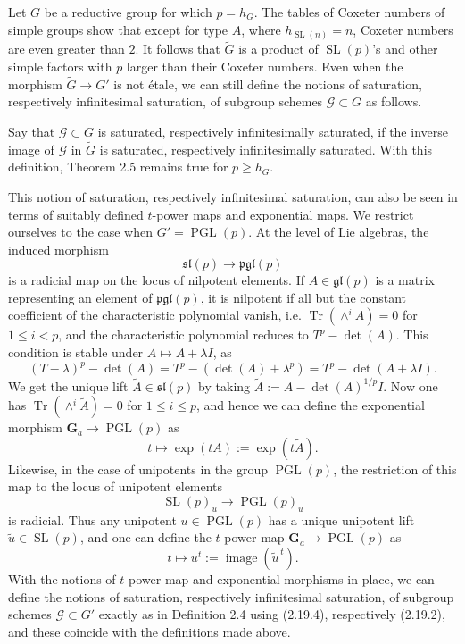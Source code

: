 \documentclass[11pt]{article}
\newcommand{\Ga}{\mathbf G_a}
\newcommand{\SL}{\operatorname{SL}}
\newcommand{\PGL}{\operatorname{PGL}}
\newcommand{\Tr}{\operatorname{Tr}}
\begin{document}
Let \(G\) be a reductive group for which \(p=h_G\). The tables of Coxeter numbers of
simple groups show that except for type \(A\), where \(h_{\SL(n)}=n\), Coxeter numbers
are even greater than \(2\). It follows that \(\widetilde G\) is a product of
\(\SL(p)\)'s and other simple factors with \(p\) larger than their Coxeter numbers. Even
when the morphism \(\widetilde G\to G'\) is not étale, we can still define the notions
of saturation, respectively infinitesimal saturation, of subgroup schemes
\(\mathcal G\subset G\) as follows.

Say that \(\mathcal G\subset G\) is saturated, respectively infinitesimally saturated, if
the inverse image of \(\mathcal G\) in \(\widetilde G\) is saturated, respectively
infinitesimally saturated. With this definition, Theorem 2.5 remains true for
\(p\ge h_G\).

This notion of saturation, respectively infinitesimal saturation, can also be seen in
terms of suitably defined \(t\)-power maps and exponential maps. We restrict ourselves to
the case when \(G'=\PGL(p)\). At the level of Lie algebras, the induced morphism
\begin{equation}
  \mathfrak{sl}(p)\longrightarrow \mathfrak{pgl}(p)
  \tag{2.19.1}
\end{equation}
is a radicial map on the locus of nilpotent elements. If \(A\in\mathfrak{gl}(p)\) is a
matrix representing an element of \(\mathfrak{pgl}(p)\), it is nilpotent if all but the
constant coefficient of the characteristic polynomial vanish, i.e.
\(\Tr(\wedge^i A)=0\) for \(1\le i<p\), and the characteristic polynomial reduces to
\(T^p-\det(A)\). This condition is stable under \(A\mapsto A+\lambda I\), as
\[
  (T-\lambda)^p-\det(A)=T^p-(\det(A)+\lambda^p)=T^p-\det(A+\lambda I).
\]
We get the unique lift \(\widetilde A\in\mathfrak{sl}(p)\) by taking
\(\widetilde A:=A-\det(A)^{1/p}I\). Now one has \(\Tr(\wedge^i\widetilde A)=0\) for
\(1\le i\le p\), and hence we can define the exponential morphism
\(\Ga\to\PGL(p)\) as
\begin{equation}
  t\longmapsto \exp(tA):=\exp(t\widetilde A).
  \tag{2.19.2}
\end{equation}
Likewise, in the case of unipotents in the group \(\PGL(p)\), the restriction of this
map to the locus of unipotent elements
\begin{equation}
  \SL(p)_u\longrightarrow \PGL(p)_u
  \tag{2.19.3}
\end{equation}
is radicial. Thus any unipotent \(u\in\PGL(p)\) has a unique unipotent lift
\(\widetilde u\in\SL(p)\), and one can define the \(t\)-power map \(\Ga\to\PGL(p)\) as
\begin{equation}
  t\longmapsto u^t:=\operatorname{image}(\widetilde u^{\,t}).
  \tag{2.19.4}
\end{equation}
With the notions of \(t\)-power map and exponential morphisms in place, we can define
the notions of saturation, respectively infinitesimal saturation, of subgroup schemes
\(\mathcal G\subset G'\) exactly as in Definition 2.4 using (2.19.4), respectively
(2.19.2), and these coincide with the definitions made above.
\end{document}
